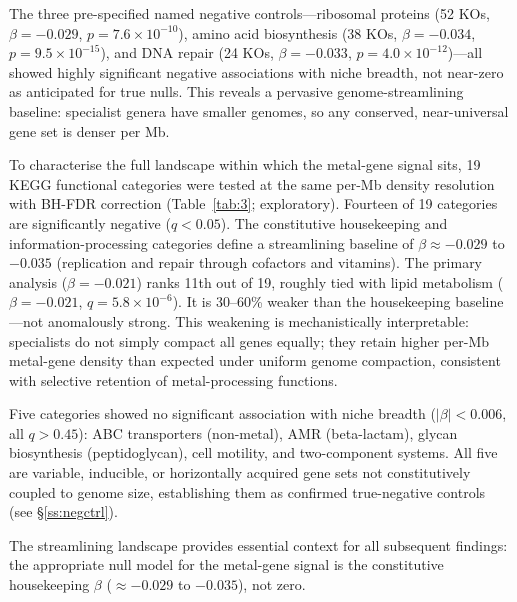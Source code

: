 \documentclass[times]{zHenriquesLab-StyleBioRxiv}
\begin{document}
The three pre-specified named negative controls---ribosomal proteins (52 KOs,
$\beta = -0.029$, $p = 7.6 \times 10^{-10}$), amino acid biosynthesis (38 KOs,
$\beta = -0.034$, $p = 9.5 \times 10^{-15}$), and DNA repair (24 KOs,
$\beta = -0.033$, $p = 4.0 \times 10^{-12}$)---all showed highly significant
negative associations with niche breadth, not near-zero as anticipated for true
nulls. This reveals a pervasive genome-streamlining baseline: specialist genera
have smaller genomes, so any conserved, near-universal gene set is denser per Mb.

To characterise the full landscape within which the metal-gene signal sits,
19 KEGG functional categories were tested at the same per-Mb density resolution
with BH-FDR correction (Table~\ref{tab:3}; exploratory). Fourteen of 19
categories are significantly negative ($q < 0.05$). The constitutive
housekeeping and information-processing categories define a streamlining
baseline of $\beta \approx -0.029$ to $-0.035$ (replication and repair through
cofactors and vitamins). The primary analysis ($\beta = -0.021$) ranks 11th out of 19, roughly
tied with lipid metabolism ($\beta = -0.021$, $q = 5.8 \times 10^{-6}$). It is
30--60\% weaker than the housekeeping baseline---not anomalously strong. This
weakening is mechanistically interpretable: specialists do not simply compact
all genes equally; they retain higher per-Mb metal-gene density than expected under uniform genome
compaction, consistent with selective retention of metal-processing functions.

Five categories showed no significant association with niche breadth
($|\beta| < 0.006$, all $q > 0.45$): ABC transporters (non-metal), AMR
(beta-lactam), glycan biosynthesis (peptidoglycan), cell motility, and
two-component systems. All five are variable, inducible, or horizontally
acquired gene sets not constitutively coupled to genome size, establishing them
as confirmed true-negative controls (see \S\ref{ss:negctrl}).

The streamlining landscape provides essential context for all subsequent
findings: the appropriate null model for the metal-gene signal is the
constitutive housekeeping $\beta$ ($\approx -0.029$ to $-0.035$), not zero.
\end{document}
